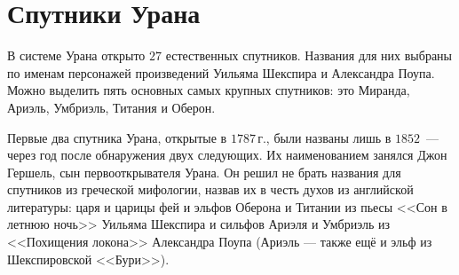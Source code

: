 \documentclass{article}
\begin{document}
    \section{Спутники Урана} 
    \hspace*{12pt} В системе Урана открыто $27$ естественных спутников. Названия для них выбраны по именам персонажей произведений Уильяма Шекспира и Александра Поупа. Можно выделить пять основных самых крупных спутников: это Миранда, Ариэль, Умбриэль, Титания и Оберон.\par 
    Первые два спутника Урана, открытые в $1787$\,г., были названы лишь в $1852$~--- через год после обнаружения двух следующих. Их наименованием занялся Джон Гершель, сын первооткрывателя Урана. Он решил не брать названия для спутников из греческой мифологии, назвав их в честь духов из английской литературы: царя и царицы фей и эльфов Оберона и Титании из пьесы <<Сон в летнюю ночь>> Уильяма Шекспира и сильфов Ариэля и Умбриэль из <<Похищения локона>> Александра Поупа (Ариэль --- также ещё и эльф из Шекспировской <<Бури>>).\\
    
\end{document}
